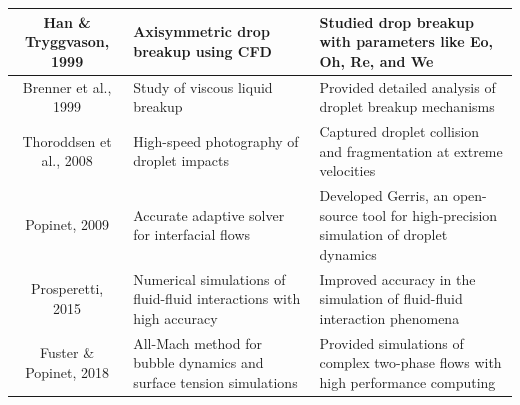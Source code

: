 \documentclass[12pt]{article}
\begin{document}
\begin{table}[htbp]
\begin{tabularx}{\textwidth}{|c|X|X|}
Han \& Tryggvason, 1999      & Axisymmetric drop breakup using CFD                                    & Studied drop breakup with parameters like Eo, Oh, Re, and We                            \\ \hline
Brenner et al., 1999         & Study of viscous liquid breakup                                        & Provided detailed analysis of droplet breakup mechanisms                                \\ \hline
Thoroddsen et al., 2008      & High-speed photography of droplet impacts                             & Captured droplet collision and fragmentation at extreme velocities                      \\ \hline
Popinet, 2009                & Accurate adaptive solver for interfacial flows                        & Developed Gerris, an open-source tool for high-precision simulation of droplet dynamics \\ \hline
Prosperetti, 2015            & Numerical simulations of fluid-fluid interactions with high accuracy   & Improved accuracy in the simulation of fluid-fluid interaction phenomena                \\ \hline
Fuster \& Popinet, 2018      & All-Mach method for bubble dynamics and surface tension simulations    & Provided simulations of complex two-phase flows with high performance computing         \\ \hline
\end{tabularx}
\end{table}




\end{document}
